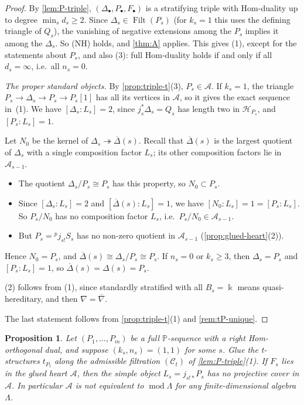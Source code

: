 \documentclass[11pt,reqno]{amsart}
\theoremstyle{plain}
\newtheorem{proposition}[theorem]{Proposition}
\theoremstyle{definition}
\theoremstyle{remark}
\newcommand{\kk}{\Bbbk}
\DeclareMathOperator{\Filt}{Filt}
\newcommand{\modd}{\operatorname{mod}}
\newcommand{\nablabar}{\overline{\nabla}}
\newcommand{\Deltabar}{\overline{\Delta}}
\newcommand{\cA}{\mathcal{A}}
\newcommand{\cH}{\mathcal{H}}
\newcommand{\cC}{\mathcal{C}}
\begin{document}
\begin{proof}
By \cref{lem:P-triple}, $(\Delta_\bullet,P_\bullet,F_\bullet)$ is a stratifying triple with Hom-duality up to degree $\min_sd_s\ge2$. Since $\Delta_s\in\Filt(P_s)$ (for $k_s=1$ this uses the defining triangle of $Q_s$), the vanishing of negative extensions among the $P_s$ implies it among the $\Delta_s$. So (NH) holds, and \cref{thm:A} applies. This gives (1), except for the statements about $P_s$, and also (3): full Hom-duality holds if and only if all $d_s=\infty$, i.e.\ all $n_s=0$.

\emph{The proper standard objects.} By \cref{prop:triple-t}(3), $P_s\in\cA$. If $k_s=1$, the triangle $P_s\to\Delta_s\to P_s\to P_s[1]$ has all its vertices in $\cA$, so it gives the exact sequence in~(1). We have $[\Delta_s:L_s]=2$, since $j_s^*\Delta_s=Q_s$ has length two in $\cH_{P_s}$, and $[P_s:L_s]=1$.

Let $N_0$ be the kernel of $\Delta_s\twoheadrightarrow\Deltabar(s)$. Recall that $\Deltabar(s)$ is the largest quotient of $\Delta_s$ with a single composition factor $L_s$; its other composition factors lie in $\cA_{s-1}$.
\begin{itemize}
\item The quotient $\Delta_s/P_s\cong P_s$ has this property, so $N_0\subset P_s$.
\item Since $[\Delta_s:L_s]=2$ and $[\Deltabar(s):L_s]=1$, we have $[N_0:L_s]=1=[P_s:L_s]$. So $P_s/N_0$ has no composition factor $L_s$, i.e.\ $P_s/N_0\in\cA_{s-1}$.
\item But $P_s={}^p\!j_{s!}S_s$ has no non-zero quotient in $\cA_{s-1}$ (\cref{prop:glued-heart}(2)).
\end{itemize}
Hence $N_0=P_s$, and $\Deltabar(s)\cong\Delta_s/P_s\cong P_s$. If $n_s=0$ or $k_s\ge3$, then $\Delta_s=P_s$ and $[P_s:L_s]=1$, so $\Deltabar(s)=\Delta(s)=P_s$.

(2) follows from (1), since standardly stratified with all $B_s=\kk$ means quasi-hereditary, and then $\nabla=\nablabar$.

The last statement follows from \cref{prop:triple-t}(1) and \cref{rem:tP-unique}.
\end{proof}

\begin{proposition}\label{prop:P11}
Let $(P_1,\dots,P_m)$ be a full $\mathbb{P}$-sequence with a right Hom-orthogonal dual, and suppose $(k_s,n_s)=(1,1)$ for some $s$. Glue the t-structures $t_{P_t}$ along the admissible filtration $(\cC_t)$ of \cref{lem:P-triple}(1). If $F_s$ lies in the glued heart $\cA$, then the simple object $L_s=j_{s!*}P_s$ has no projective cover in $\cA$. In particular $\cA$ is not equivalent to $\modd\Lambda$ for any finite-dimensional algebra $\Lambda$.
\end{proposition}
\end{document}
